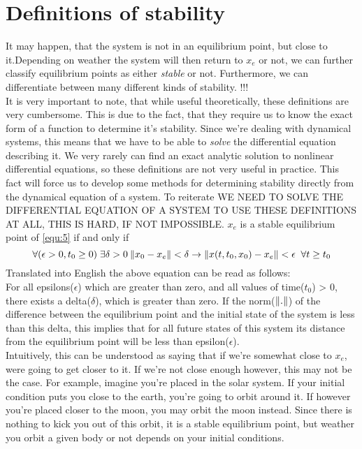 \section{Definitions of stability}
It may happen, that the system is not in an equilibrium point, but close to it.Depending on weather the system will then return to $x_e$ or not, we can further classify equilibrium points as either  \textit{stable} or  not. Furthermore, we can differentiate between many different kinds of stability.
\nt
{
    !!!\\
    It is very important to note, that while useful theoretically, these definitions are very cumbersome. This is due to the fact, that they require us to know the exact form of a function to determine it's stability. Since we're dealing with dynamical systems, this means that we have to be able to  \textit{solve} the differential equation
    describing it. We very rarely can find an exact analytic solution to nonlinear differential equations, so these definitions are not very useful in practice. This fact will force us to develop some methods for determining stability directly from the dynamical equation of a system.
    To reiterate WE NEED TO SOLVE THE DIFFERENTIAL EQUATION OF A SYSTEM TO USE THESE DEFINITIONS AT ALL, THIS IS HARD, IF NOT IMPOSSIBLE.
}
{
    $x_e$ is a stable equilibrium point of  \ref{equ:5} if and only if \\
    \begin{equation}
        \label{dfn:stab_eq_pt}
        \forall( \epsilon > 0, t_0 \ge 0)\;  \exists \delta > 0 \: \lVert x_0-x_e\rVert < \delta \rightarrow \lVert x(t,t_0,x_0) - x_e\rVert < \epsilon \;\; \forall t \ge t_0   
    \end{equation}
    Translated into English the above equation can be read as follows:\\
    For all epsilons($\epsilon$) which are greater than zero, and all values of time($t_0$) > 0, there exists a delta($\delta$), which is greater than zero. If the norm($\lVert.\rVert$) of the difference between the equilibrium point and the initial state of the system is less than this delta, this implies that for all future states of this system its distance from the equilibrium point will be less than epsilon($\epsilon$).\\
    Intuitively, this can be understood as saying that if we're somewhat close to $x_e$, were going to get closer to it. If we're not close enough however, this may not be the case. For example, imagine you're placed in the solar system. If your initial condition puts you close to the earth, you're going to orbit around it. If however you're placed closer to the moon, you may orbit the moon instead. Since there is nothing to kick you out of this orbit, it is a stable equilibrium point, but weather you orbit a given body or not depends on your initial conditions.
}

